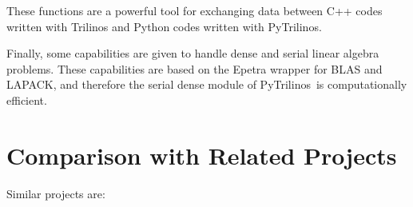 \documentclass[10pt,relax]{SANDreport}
\newcommand{\PyTrilinos}{{PyTrilinos}}
\begin{document}
These functions are a powerful tool for exchanging data between C++
codes written with Trilinos and Python codes written with \PyTrilinos.

Finally, some capabilities are given to handle dense and serial linear
algebra problems.  These capabilities are based on the Epetra wrapper
for BLAS and LAPACK, and therefore the serial dense module of
\PyTrilinos\ is computationally efficient.

\section{Comparison with Related Projects}
\label{sec:related}

Similar projects are:
\end{document}
